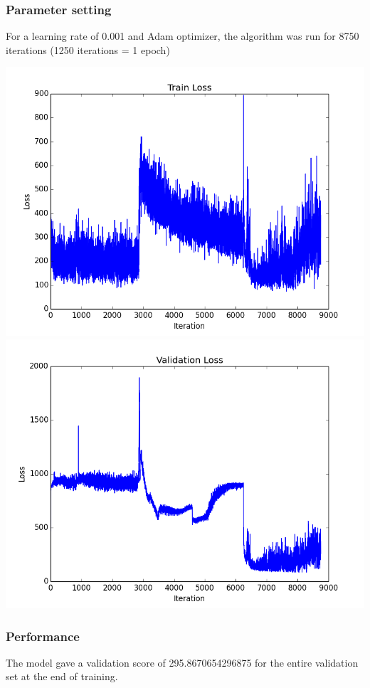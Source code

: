 \documentclass[12pt]{report}
\begin{document}
\subsubsection{Parameter setting}
For a learning rate of 0.001 and Adam optimizer, the algorithm was run for 8750 iterations (1250 iterations = 1 epoch)
\begin{center}
\includegraphics[scale=0.5]{train_loss_8500.png} \\
\vspace{3mm}
\includegraphics[scale=0.5]{val_loss_8500.png} 
\end{center}
\subsubsection{Performance}
The model gave a validation score of 295.8670654296875 for the entire validation set at the end of training.
\\
\end{document}
